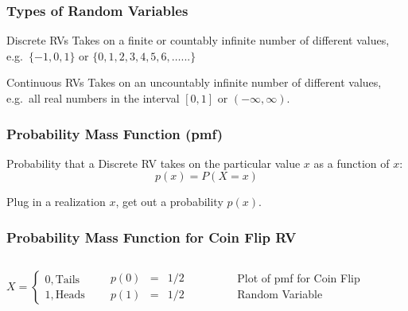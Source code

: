 \documentclass[handout]{beamer}
\begin{document}
\begin{frame}
\frametitle{Types of Random Variables}
 
	\begin{block}{Discrete RVs}
	Takes on a finite or countably infinite number of different values, e.g.\  $\{-1, 0, 1\}$ or $\{0, 1, 2, 3, 4, 5, 6, \hdots ...\}$
	\end{block}
 	
	\begin{block}{Continuous RVs}
	Takes on an uncountably infinite number of different values, e.g.\ all real numbers in the interval $[0,1]$ or $(-\infty, \infty)$.
	\end{block}

\end{frame}
\begin{frame}
\frametitle{Probability Mass Function (pmf)}
 Probability that a \alert{Discrete RV} takes on the particular value $x$ as a function of $x$:
 $$p(x) = P(X =x)$$

 

\begin{alertblock}{Plug in a realization $x$, get out a probability  $p(x)$.}\end{alertblock}

 


\end{frame}
\begin{frame}
\frametitle{Probability Mass Function for Coin Flip RV}

\begin{columns}
$$X = \left\{ \begin{array}{l}  0, \mbox{Tails}\\ 1, \mbox{Heads}\end{array} \right.$$

\begin{eqnarray*}
	p(0) &=& 1/2\\
	p(1) &=& 1/2
\end{eqnarray*}


\begin{figure}
\centering
{}
\caption{Plot of pmf for Coin Flip Random Variable}
\end{figure}
\end{columns}


\end{frame}
\end{document}
